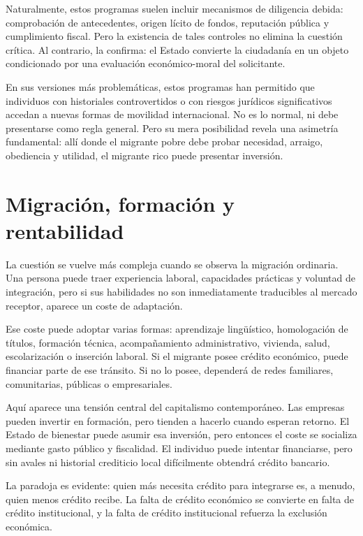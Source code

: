 \documentclass[12pt,a4paper]{article}
\begin{document}
Naturalmente, estos programas suelen incluir mecanismos de diligencia debida: comprobación de antecedentes, origen lícito de fondos, reputación pública y cumplimiento fiscal. Pero la existencia de tales controles no elimina la cuestión crítica. Al contrario, la confirma: el Estado convierte la ciudadanía en un objeto condicionado por una evaluación económico-moral del solicitante.

En sus versiones más problemáticas, estos programas han permitido que individuos con historiales controvertidos o con riesgos jurídicos significativos accedan a nuevas formas de movilidad internacional. No es lo normal, ni debe presentarse como regla general. Pero su mera posibilidad revela una asimetría fundamental: allí donde el migrante pobre debe probar necesidad, arraigo, obediencia y utilidad, el migrante rico puede presentar inversión.

\section*{Migración, formación y rentabilidad}

La cuestión se vuelve más compleja cuando se observa la migración ordinaria. Una persona puede traer experiencia laboral, capacidades prácticas y voluntad de integración, pero si sus habilidades no son inmediatamente traducibles al mercado receptor, aparece un coste de adaptación.

Ese coste puede adoptar varias formas: aprendizaje lingüístico, homologación de títulos, formación técnica, acompañamiento administrativo, vivienda, salud, escolarización o inserción laboral. Si el migrante posee crédito económico, puede financiar parte de ese tránsito. Si no lo posee, dependerá de redes familiares, comunitarias, públicas o empresariales.

Aquí aparece una tensión central del capitalismo contemporáneo. Las empresas pueden invertir en formación, pero tienden a hacerlo cuando esperan retorno. El Estado de bienestar puede asumir esa inversión, pero entonces el coste se socializa mediante gasto público y fiscalidad. El individuo puede intentar financiarse, pero sin avales ni historial crediticio local difícilmente obtendrá crédito bancario.

La paradoja es evidente: quien más necesita crédito para integrarse es, a menudo, quien menos crédito recibe. La falta de crédito económico se convierte en falta de crédito institucional, y la falta de crédito institucional refuerza la exclusión económica.
\end{document}
